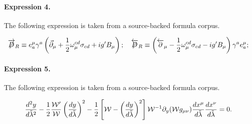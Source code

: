 \documentclass[11pt]{article}
\begin{document}
\paragraph{Expression 4.} The following expression is taken from a source-backed formula corpus.

\begin{align*}\overrightarrow{\not\!\!D}_{R}\equiv e^{\mu}_{a}\gamma^{a}\left(\vec{\partial}_{\mu}+\frac{1}{2}\omega_{\mu}^{cd}\sigma_{cd}+ig^{\prime}B_{\mu}\right); \quad\overleftarrow{\not\!\!D}_{R}\equiv\left(\overleftarrow{\partial}_{\mu}-\frac{1}{2}\omega_{\mu}^{cd}\sigma_{cd}-ig^{\prime}B_{\mu}\right)\gamma^{a}e_{a}^{\mu};\end{align*}

\paragraph{Expression 5.} The following expression is taken from a source-backed formula corpus.

\begin{align*}{{d^2y}\over{d\tilde{\lambda}^2}}-{1\over 2}{{{\cal W}^{\prime}}\over{\cal W}}\left({{dy}\over{d\tilde{\lambda}}}\right)^2-{1\over 2}\left[{\cal W}-\left({{dy}\over{d\tilde{\lambda}}}\right)^2\right]{\cal W}^{-1}\partial_y({\cal W}g_{\mu\nu}){{dx^{\mu}}\over{d\tilde{\lambda}}}{{dx^{\nu}}\over{d\tilde{\lambda}}}=0.\end{align*}
\end{document}
